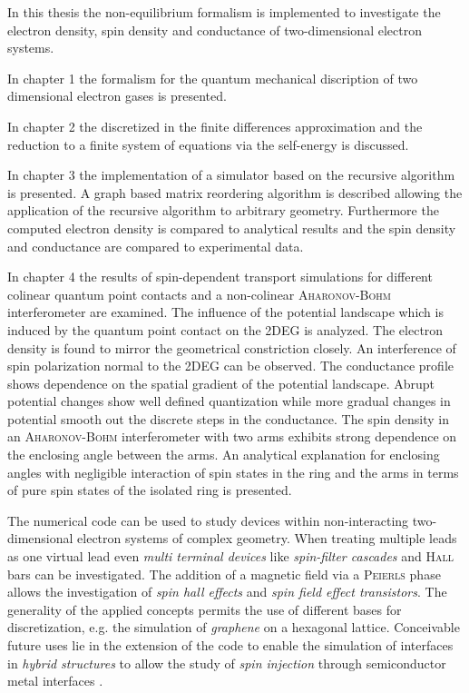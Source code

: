 In this thesis the non-equilibrium \gfnc{} formalism is implemented to investigate the electron density, spin density and conductance of two-dimensional electron systems.\par
In chapter 1 the \gfnc{} formalism for the quantum mechanical discription of two dimensional electron gases is presented.\par
In chapter 2 the discretized \hamil{} in the finite differences approximation and the reduction to a finite system of equations via the self-energy is discussed.\par
In chapter 3 the implementation of a simulator based on the recursive \gfnc{} algorithm is presented. A graph based matrix reordering algorithm is described allowing the application of the recursive \gfnc{} algorithm to arbitrary geometry.
Furthermore the computed electron density is compared to analytical results and the spin density and conductance are compared to experimental data.\par
In chapter 4 the results of spin-dependent transport simulations for different colinear quantum point contacts and a non-colinear \textsc{Aharonov-Bohm} interferometer are examined. The influence of the potential landscape which is induced by the quantum point contact on the 2DEG is analyzed.
The electron density is found to mirror the geometrical constriction closely. An interference of spin polarization normal to the 2DEG can be observed. The conductance profile shows dependence on the spatial gradient of the potential landscape. Abrupt potential changes show well defined quantization while more gradual changes in potential smooth out the discrete steps in the conductance.
The spin density in an \textsc{Aharonov-Bohm} interferometer with two arms exhibits strong dependence on the enclosing angle between the arms. An analytical explanation for enclosing angles with negligible interaction of spin states in the ring and the arms in terms of pure spin states of the isolated ring is presented.\par
The numerical code can be used to study devices within non-interacting two-dimensional electron systems of complex geometry. When treating multiple leads as one virtual lead even \emph{multi terminal devices} like \emph{spin-filter cascades} \cite{jacob:093714} and \textsc{Hall} bars \cite{Wunderlich24122010} can be investigated. The addition of a magnetic field via a \textsc{Peierls} phase allows the investigation of \emph{spin hall effects} and \emph{spin field effect transistors}. The generality of the applied concepts permits the use of different bases for discretization, e.g. the simulation of \emph{graphene} on a hexagonal lattice. Conceivable future uses lie in the extension of the code to enable the simulation of interfaces in \emph{hybrid structures} to allow the study of \emph{spin injection} through semiconductor metal interfaces \cite{holz:431}.
